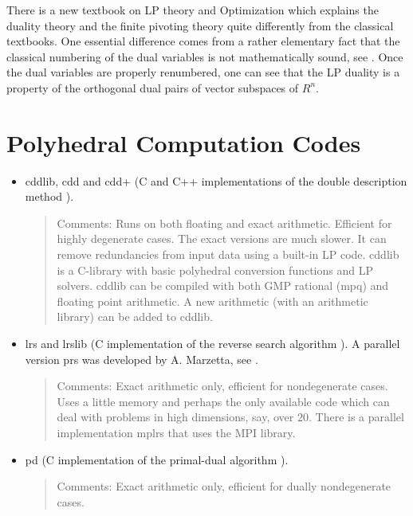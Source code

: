 \documentclass[a4paper,12pt]{article}
\begin{document}
There is a new textbook on LP theory and Optimization \cite{f-io-20} which explains the duality
theory and the finite pivoting theory quite differently from the classical
textbooks.   One essential difference comes from a rather elementary fact
that the classical numbering of the dual
variables is not mathematically sound, see \cite[Chap 1--4]{f-io-20}.  Once
the dual variables are properly renumbered, one can see that the LP duality
 is a property of the orthogonal dual pairs of vector subspaces
of $R^n$.


\section{Polyhedral Computation Codes} \label{Sec:codes}
\begin{itemize}
\item cddlib, cdd  and cdd+ \cite{f-cddhome} 
(C and C++ implementations of the double description method \cite{mrtt-ddm-53}).
\begin{quote}
Comments: Runs on both floating and exact arithmetic.  Efficient for highly 
degenerate cases.  The exact
versions are much slower.   It can remove redundancies from input data
using a built-in LP code.  cddlib is a C-library with basic
polyhedral conversion functions and LP solvers.  cddlib can be
compiled with both GMP rational (mpq) and floating point arithmetic.
A new arithmetic (with an arithmetic library) can be added to cddlib.
\end{quote}

\item lrs and lrslib  \cite{a-lrshome-01} (C implementation of the reverse search algorithm 
\cite{af-pachv-92}).  A parallel version prs was developed by A. Marzetta,
see \cite{bmfn-psbza-96}.
\begin{quote}
Comments: Exact arithmetic only, efficient for nondegenerate cases.  Uses a little memory
and perhaps the only available code which can deal with problems in high dimensions, say, over $20$.  
There is a parallel implementation mplrs that uses the MPI library.
\end{quote}

\item pd  \cite{m-pdcip-97} (C implementation of the primal-dual algorithm 
\cite{bfm-pdmvf-97}). 
\begin{quote}
Comments: Exact arithmetic only, efficient for dually nondegenerate cases. 
\end{quote}


\end{itemize}
\end{document}
